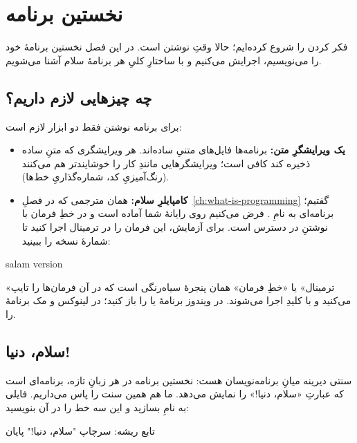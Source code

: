 \chapter{نخستین برنامه}%
\label{ch:first-program}

فکر کردن را شروع کرده‌ایم؛ حالا وقتِ نوشتن است. در این فصل نخستین برنامهٔ
خود را می‌نویسیم، اجرایش می‌کنیم و با ساختارِ کلیِ هر برنامهٔ سلام آشنا
می‌شویم.

\section{چه چیزهایی لازم داریم؟}

برای برنامه نوشتن فقط دو ابزار لازم است:

\begin{itemize}
  \item \textbf{یک ویرایشگرِ متن:} برنامه‌ها فایل‌های متنیِ ساده‌اند. هر
        ویرایشگری که متنِ ساده ذخیره کند کافی است؛ ویرایشگرهایی مانندِ
         کار را خوشایندتر هم می‌کنند (رنگ‌آمیزیِ کد،
        شماره‌گذاریِ خط‌ها).
  \item \textbf{کامپایلرِ سلام:} همان مترجمی که در فصلِ~\ref{ch:what-is-programming} گفتیم؛ برنامه‌ای به نامِ .
        فرض می‌کنیم روی رایانهٔ شما آماده است و در خطِ فرمان با نوشتنِ
         در دسترس است. برای آزمایش، این فرمان را در ترمینال
        اجرا کنید تا شمارهٔ نسخه را ببینید:
\end{itemize}

\begin{shell}
salam version
\end{shell}

\begin{note}
«ترمینال» یا «خطِ فرمان» همان پنجرهٔ سیاه‌رنگی است که در آن فرمان‌ها را
تایپ می‌کنید و با کلیدِ  اجرا می‌شوند. در ویندوز برنامهٔ
 یا  را باز کنید؛ در لینوکس و مک برنامهٔ
 را.
\end{note}

\section{سلام، دنیا!}

سنتی دیرینه میانِ برنامه‌نویسان هست: نخستین برنامه در هر زبانِ تازه،
برنامه‌ای است که عبارتِ «سلام، دنیا!» را نمایش می‌دهد. ما هم همین سنت را
پاس می‌داریم. فایلی به نامِ  بسازید و این سه خط را در آن
بنویسید:

\begin{salamfa}
تابع ریشه:
    سرچاپ "سلام، دنیا!"
پایان
\end{salamfa}

